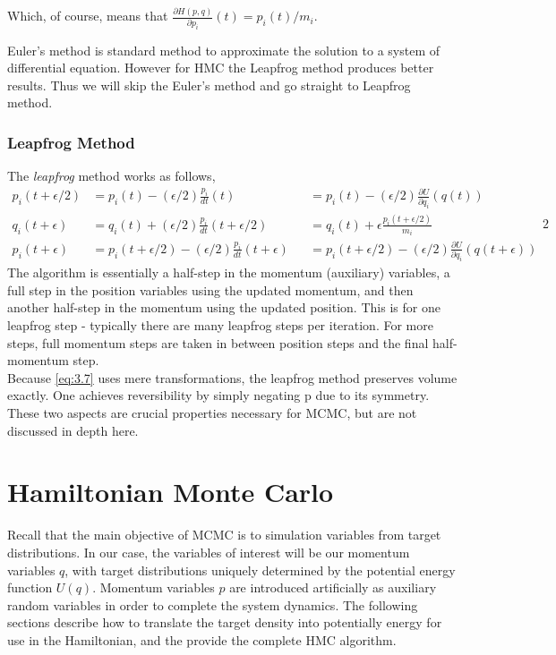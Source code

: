\documentclass{article}
\numberwithin{equation}{section}
\begin{document}
Which, of course, means that $\frac{\partial H(p,q)}{\partial p_i}(t) = p_i(t)/m_i$.

Euler's method is standard method to approximate the solution to a system of differential equation. However for HMC the Leapfrog method produces better results. Thus we will skip the Euler's method and go straight to Leapfrog method.

\subsubsection{Leapfrog Method}
The \textit{leapfrog} method works as follows,
\begin{equation}
\begin{alignedat}{2}
p_i(t+\epsilon/2) &=  p_i(t) - (\epsilon/2)\frac{p_i}{dt}(t) &&=   p_i(t) - (\epsilon/2)\frac{\partial U}{\partial q_i}(q(t))\\
q_i(t+\epsilon)   &= q_i(t) + (\epsilon/2)\frac{p_i}{dt}(t + \epsilon/2) &&=  q_i(t) + \epsilon \frac{p_i(t+\epsilon/2)}{m_i}\\
p_i(t+\epsilon) &= p_i(t + \epsilon/2) - (\epsilon/2)\frac{p_i}{dt}(t + \epsilon) &&= p_i(t+\epsilon/2) - (\epsilon/2)\frac{\partial U}{\partial q_i}(q(t+\epsilon))
\label{eq:3.7}
\end{alignedat}{2}
\end{equation}
The algorithm is essentially a half-step in the momentum (auxiliary) variables, a full step in the position variables using the updated momentum, and then another half-step in the momentum using the updated position. This is for one leapfrog step - typically there are many leapfrog steps per iteration. For more steps, full momentum steps are taken in between position steps and the final half-momentum step.\\

Because \ref{eq:3.7} uses mere transformations, the leapfrog method preserves volume exactly. One achieves reversibility by simply negating p due to its symmetry. These two aspects are crucial properties necessary for MCMC, but are not discussed in depth here.

\section{Hamiltonian Monte Carlo}
Recall that the main objective of MCMC is to simulation variables from target distributions. In our case, the variables of interest will be our momentum variables $q$, with target distributions uniquely determined by the potential energy function $U(q)$. Momentum variables $p$ are introduced artificially as auxiliary random variables in order to complete the system dynamics. The following sections describe how to translate the target density into potentially energy for use in the Hamiltonian, and the provide the complete HMC algorithm.\\
\end{document}
